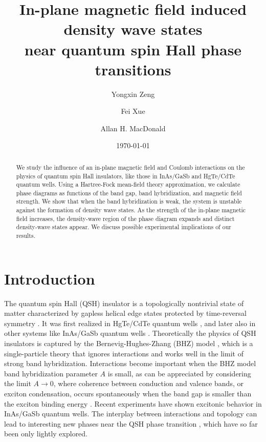 \documentclass[reprint,aps,superscriptaddress]{revtex4-2}
\begin{document}
\title{In-plane magnetic field induced density wave states \\ near quantum spin Hall phase transitions}
\author{Yongxin Zeng}   
\author{Fei Xue}
\author{Allan H. MacDonald}
\date{\today}
\begin{abstract}
We study the influence of an in-plane magnetic field and Coulomb interactions on the physics of quantum spin Hall insulators, like those  
in InAs/GaSb and HgTe/CdTe quantum wells.  Using a Hartree-Fock mean-field theory approximation, we calculate phase diagrams as functions of the band gap, band hybridization, and magnetic field strength. We show that when the band hybridization is weak, the system is unstable against the 
formation of density wave states. As the strength of the in-plane magnetic field increases, the density-wave
region of the phase diagram expands and distinct density-wave states appear. 
We discuss possible experimental implications of our results.
\end{abstract}
\maketitle

\section{Introduction}

The quantum spin Hall (QSH) insulator is a topologically nontrivial state of matter characterized by gapless helical edge states protected by time-reversal symmetry \cite{KaneMele_QSH,KaneMele_Z2}. It was first realized in HgTe/CdTe quantum wells \cite{bernevig2006quantum,konig2007quantum}, and later also in other systems like InAs/GaSb quantum wells \cite{liu2008quantum,knez2011evidence,du2015robust}. Theoretically the physics of QSH insulators is captured by the 
Bernevig-Hughes-Zhang (BHZ) model \cite{bernevig2006quantum}, which is a single-particle theory that 
ignores interactions and works well in the limit of strong band hybridization.
Interactions become important when the BHZ model band hybridization parameter $A$ is small, as can be appreciated by 
considering the limit $A \to 0$, where coherence between conduction and valence bands, or exciton condensation,
occurs spontaneously when the band gap is smaller than the exciton binding energy \cite{Keldysh1965,jerome1967excitonic,Lozovik1976,Comte1982,zhu1995exciton,lozovik1996phase,high2012spontaneous,wu2015theory}. 
Recent experiments \cite{du2017evidence,wu2019electrically,wu2019resistive} have shown excitonic behavior in InAs/GaSb quantum wells. 
The interplay between interactions and topology can lead to interesting new phases near the QSH phase transition \cite{budich2014time,pikulin2014interplay,hu2017topological,xue2018time}, which have so far been only lightly explored.
\end{document}
